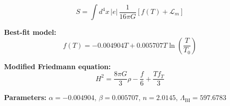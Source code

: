 
\begin{equation}
  S = \int d^4x \, |e| \, \frac{1}{16\pi G} \left[ f(T) + \mathcal{L}_m \right]
\end{equation}

\textbf{Best-fit model:}
\begin{equation}
  f(T) = -0.004904 T + 0.005707 T \ln\!\left(\frac{T}{T_0}\right)
\end{equation}

\textbf{Modified Friedmann equation:}
\begin{equation}
  H^2 = \frac{8\pi G}{3} \rho - \frac{f}{6} + \frac{T f_T}{3}
\end{equation}

\textbf{Parameters:}
$\alpha = -0.004904$, \quad
$\beta = 0.005707$, \quad
$n = 2.0145$, \quad
$\Lambda_{\text{BI}} = 597.6783$